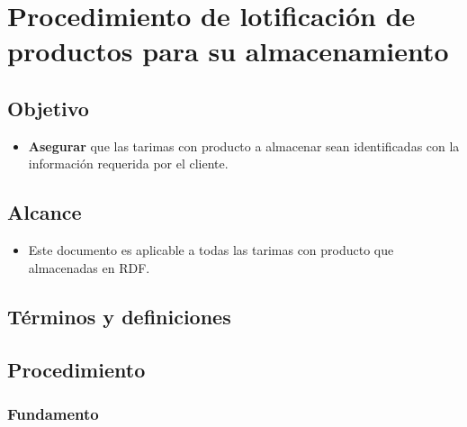 \thispagestyle{formato-PI}
\renewcommand{\MayorVer}{2}
\renewcommand{\MenorVer}{0}
\renewcommand{\Codigo}{PSA-2-PRO} 
\renewcommand{\FechaPub}{2023--01}
\renewcommand{\Titulo}{Procedimiento de lotificación de productos para su almacenamiento}

\section{\Titulo}


\subsection{Objetivo}

\begin{itemize}
	\item \textbf{Asegurar} que las tarimas con producto a almacenar sean identificadas con la información requerida por el cliente.
\end{itemize}

\subsection{Alcance}

\begin{itemize}
	\item Este documento es aplicable a todas las tarimas con producto que almacenadas en RDF.
\end{itemize}

\subsection{Términos y definiciones}

\subsection{Procedimiento}

\subsubsection{Fundamento}

